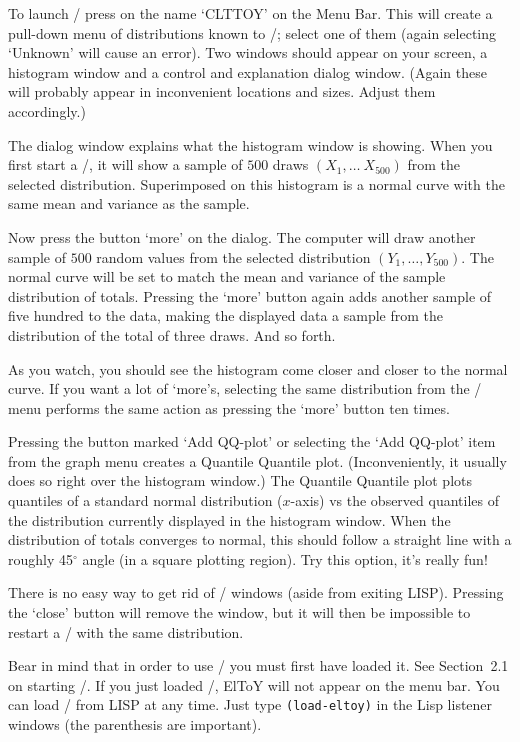 
To launch \clttoy/ press on the name `CLTTOY' on the Menu Bar.  This
will create a pull-down menu of distributions known to \clttoy/;
select one of them (again selecting `Unknown' will cause an error).
Two windows should appear on your screen, a histogram window and a
control and explanation dialog window.  (Again these will probably
appear in inconvenient locations and sizes.  Adjust them accordingly.)

The dialog window explains what the histogram window is showing.
When you first start a \clttoy/, it will show a sample of $500$ draws
$(X_1, \ldots\ X_{500})$ from the selected distribution.  Superimposed
on this histogram is a normal curve with the same mean and variance as
the sample.

Now press the button `more' on the dialog.
The computer will draw another sample of $500$ random values from the
selected distribution $(Y_1,\ldots, Y_{500})$.  The normal curve will
be set to match the mean and variance of the sample distribution of
totals.  Pressing the `more' button  again adds another sample of
five hundred to the data, making the displayed data a sample from the
distribution of the total of three draws.  And so forth.

As you watch, you should see the histogram come closer and closer to
the normal curve.  If you want a lot of `more's, selecting the same
distribution from the \clttoy/ menu performs the same action as
pressing the `more' button ten times.

Pressing the button marked `Add QQ-plot' or selecting the `Add
QQ-plot' item from the graph menu creates a Quantile Quantile plot.
(Inconveniently, it usually does so right over the histogram window.)
The Quantile Quantile plot plots quantiles of a standard normal
distribution ($x$-axis) vs the observed quantiles of the distribution
currently displayed in the histogram window.  When the distribution of
totals converges to normal, this should follow a straight line with a
roughly 45${}^\circ$ angle (in a square plotting region).  Try this
option, it's really fun!

There is no easy way to get rid of \clttoy/ windows (aside from
exiting LISP).  Pressing the `close' button will remove the window,
but it will then be impossible to restart a \clttoy/ with the same
distribution.


Bear in mind that in order to use \eltoy/ you must first have loaded
it.  See Section~2.1 on starting \eltoy/.  If you just loaded
\disttoy/, ElToY will not appear on the menu bar.  You can load
\eltoy/ from LISP at any time.  Just type {\tt (load-eltoy)\/} in the
Lisp listener windows (the parenthesis are important).

